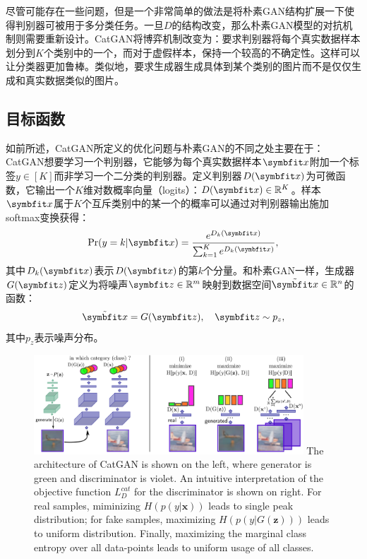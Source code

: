 尽管可能存在一些问题，但是一个非常简单的做法是将朴素GAN结构扩展一下使得判别器可被用于多分类任务。一旦$D$的结构改变，那么朴素GAN模型的对抗机制则需要重新设计。CatGAN将博弈机制改变为：要求判别器将每个真实数据样本划分到$K$个类别中的一个，而对于虚假样本，保持一个较高的不确定性。这样可以让分类器更加鲁棒。类似地，要求生成器生成具体到某个类别的图片而不是仅仅生成和真实数据类似的图片。

\subsection{目标函数}
如前所述，CatGAN所定义的优化问题与朴素GAN的不同之处主要在于：CatGAN想要学习一个判别器，它能够为每个真实数据样本$\bd{x}$附加一个标签$y \in [K]$而非学习一个二分类的判别器。定义判别器$D(\bd{x})$为可微函数，它输出一个$K$维对数概率向量（logits）：$D(\bd{x}) \in \reals^K$。样本$\bd{x}$属于$K$个互斥类别中的某一个的概率可以通过对判别器输出施加softmax变换获得：
\begin{equation}
  \Pr(y=k|\bd{x}) = \frac{e^{D_k(\bd{x})}}{\sum_{k=1}^K e^{D_k(\bd{x})}},
\end{equation}
其中$D_k(\bd{x})$表示$D(\bd{x})$的第$k$个分量。和朴素GAN一样，生成器$G(\bd{z})$定义为将噪声$\bd{z} \in \reals^m$映射到数据空间$\tilde{\bd{x}} \in \reals^n$的函数：
\begin{equation}
  \tilde{\bd{x}} = G(\bd{z}), \quad \bd{z} \sim p_z,
\end{equation}
其中$p_z$表示噪声分布。

\begin{figure}[hbtp]
  \centering
  \includegraphics[width=0.9\textwidth]{Img/arch-catgan.png}
  {The architecture of CatGAN is shown on the left, where generator is green and discriminator is violet. An intuitive interpretation of the objective function $L_D^{cat}$ for the discriminator is shown on right. For real samples, miminizing $H(p(y|\mathbf{x}))$ leads to single peak distribution; for fake samples, maximizing $H(p(y|G(\mathbf{z})))$ leads to uniform distribution. Finally, maximizing the marginal class entropy over all data-points leads to uniform usage of all classes.}
  \label{fig:arch-catgan}
\end{figure}

